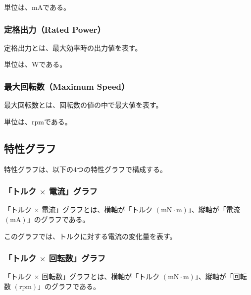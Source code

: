 単位は、$\mathrm{mA}$である。
\subsubsection{定格出力（Rated Power）}\label{sub:sub:teikakusyutu}
定格出力とは、最大効率時の出力値を表す。

単位は、$\mathrm{W}$である。
\subsubsection{最大回転数（Maximum Speed）}\label{sub:sub:saidaikai}
最大回転数とは、回転数の値の中で最大値を表す。

単位は、$\mathrm{rpm}$である。
\subsection{特性グラフ}\label{sub:tokuseigurahu}
特性グラフは、以下の4つの特性グラフで構成する。
\subsubsection{「トルク $\times$ 電流」グラフ}\label{sub:sub:torden}
「トルク $\times$ 電流」グラフとは、横軸が「トルク $(\mathrm{mN \cdot m})$」、縦軸が「電流 $(\mathrm{mA})$」のグラフである。

このグラフでは、トルクに対する電流の変化量を表す。
\subsubsection{「トルク $\times$ 回転数」グラフ}\label{sub:sub:torkaiten}
「トルク $\times$ 回転数」グラフとは、横軸が「トルク $(\mathrm{mN \cdot m})$」、縦軸が「回転数 $(\mathrm{rpm})$」のグラフである。

